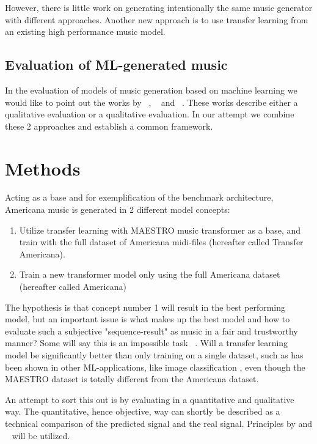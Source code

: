 \documentclass{IEEEtran}
\begin{document}
        However, there is little work on generating intentionally the same music generator
        with different approaches. Another new approach is to use transfer learning from
        an existing high performance music model.

        \subsection{Evaluation of ML-generated music}
        In the evaluation of models of music generation based on machine learning we
        would like to point out the works by \citeauthor{1030094}~\cite{1030094},
        \citeauthor{yang2020evaluation}~\cite{yang2020evaluation}
        and \citeauthor{wu2020jazz}~\cite{wu2020jazz}.
        These works describe either a qualitative evaluation or a qualitative evaluation.
        In our attempt we combine these 2 approaches and establish a common framework.

    \section{Methods}

        Acting as a base and for exemplification of the benchmark architecture,
        Americana music is generated in 2 different model concepts:
        \begin{enumerate}
            \item Utilize transfer learning with MAESTRO music transformer as a base,
                    and train with the full dataset of Americana midi-files (hereafter called Transfer Americana).
            \item Train a new transformer model only using the full Americana dataset (hereafter called Americana)
        \end{enumerate} 
        
        The hypothesis is that concept number 1 will result in the best performing model,
        but an important issue is what makes up the best model and how to evaluate such a
        subjective "sequence-result" as music in a fair and trustworthy manner? 
        Some will say this is an impossible task ~\cite{1030094}. Will a transfer learning model be significantly better than only training on a single dataset, such as has been shown in other ML-applications, like image classification \cite{7404017}, even though the MAESTRO dataset is totally different from the Americana dataset.

        An attempt to sort this out is by evaluating in a quantitative and qualitative way.
        The quantitative, hence objective, way can shortly be described as a technical
        comparison of the predicted signal and the real signal. Principles by \cite{yang2020evaluation} and ~\cite{wu2020jazz} will be utilized.
        
\end{document}
